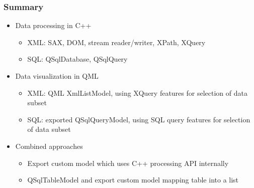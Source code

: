 \begin{slide}{}\frametitle{Summary}
\begin{itemize}
\item Data processing in C++
    \begin{itemize}
    \item XML: SAX, DOM, stream reader/writer, XPath, XQuery
    \item SQL: QSqlDatabase, QSqlQuery
    \end{itemize}
    
\medskip

\item Data visualization in QML
    \begin{itemize}
    \item XML: QML XmlListModel, using XQuery features for selection of data subset
    \item SQL: exported QSqlQueryModel, using SQL query features for selection of data subset
    \end{itemize}
    
\medskip

\item Combined approaches  
    \begin{itemize}
    \item Export custom model which uses C++ processing API internally
    \item QSqlTableModel and export custom model mapping table into a list
    \end{itemize}
\end{itemize}
\end{slide}
